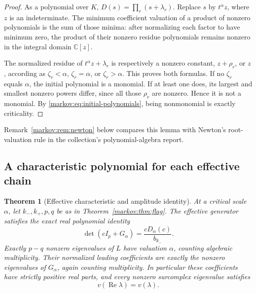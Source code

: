 \documentclass[11pt]{article}
\numberwithin{equation}{section}
\newtheorem{theorem}{Theorem}[section]
\theoremstyle{definition}
\theoremstyle{remark}
\newcommand{\C}{\mathbb C}
\newcommand{\Rea}{\operatorname{Re}}
\begin{document}
\begin{proof}
As a polynomial over $K$,
$D(s)=\prod_r(s+\lambda_r)$. Replace $s$ by $t^\alpha z$, where $z$ is an
indeterminate. The minimum coefficient valuation of a product of nonzero
polynomials is the sum of those minima: after normalizing each factor to have
minimum zero, the product of their nonzero residue polynomials remains nonzero
in the integral domain $\C[z]$.

The normalized residue of $t^\alpha z+\lambda_r$ is respectively a nonzero
constant, $z+\rho_r$, or $z$, according as $\zeta_r<\alpha$,
$\zeta_r=\alpha$, or $\zeta_r>\alpha$. This proves both formulas. If no
$\zeta_r$ equals $\alpha$, the initial polynomial is a monomial. If at least
one does, its largest and smallest nonzero powers differ, since all those
$\rho_r$ are nonzero. Hence it is not a monomial. By
\eqref{markov:eq:initial-polynomials}, being nonmonomial is exactly criticality.
\end{proof}

Remark~\ref{markov:rem:newton} below compares this lemma with Newton's
root-valuation rule in the collection's polynomial-algebra report.

\subsection{A characteristic polynomial for each effective chain}

\begin{theorem}[Effective characteristic and amplitude identity]\label{markov:thm:char}
At a critical scale $\alpha$, let $k_-,k_+,p,q$ be as in
Theorem~\ref{markov:thm:flag}. The effective generator satisfies the exact real polynomial
identity
\begin{equation}\label{markov:eq:effective-char}
 \det(cI_p+G_\alpha)=\frac{cD_\alpha(c)}{b_{k_-}}.
\end{equation}
Exactly $p-q$ nonzero eigenvalues of $L$ have valuation $\alpha$, counting
algebraic multiplicity. Their normalized leading coefficients are exactly the
nonzero eigenvalues of $G_\alpha$, again counting multiplicity. In particular
these coefficients have strictly positive real parts, and every nonzero
surcomplex eigenvalue satisfies
\begin{equation}\label{markov:eq:realpart-scale}
 v(\Rea\lambda)=v(\lambda).
\end{equation}
\end{theorem}
\end{document}
